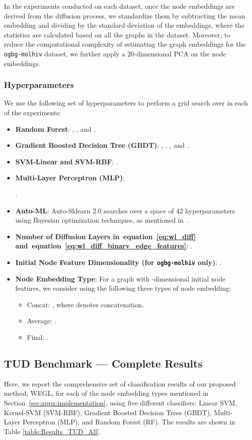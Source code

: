 \documentclass[table]{article} \usepackage{iclr2021_conference,times}
\def\eqref#1{equation~\ref{#1}}
\begin{document}
In the experiments conducted on each dataset, once the node embeddings are derived from the diffusion process, we standardize them by subtracting the mean embedding and dividing by the standard deviation of the embeddings, where the statistics are calculated based on all the graphs in the dataset. Moreover, to reduce the computational complexity of estimating the graph embeddings for the \texttt{ogbg-molhiv} dataset, we further apply a 20-dimensional PCA on the node embeddings.

\subsubsection*{Hyperparameters}
We use the following set of hyperparameters to perform a grid search over in each of the experiments:
\begin{itemize}
    \item \textbf{Random Forest}: , , and .
    \item \textbf{Gradient Boosted Decision Tree (GBDT)}: , , , and .
    \item \textbf{SVM-Linear and SVM-RBF}: .
    \item \textbf{Multi-Layer Perceptron (MLP)}:
    
    .
    \item \textbf{Auto-ML}: Auto-Sklearn 2.0 searches over a space of 42 hyperparameters using Bayesian optimization techniques, as mentioned in~\cite{feurer2020auto}.
    \item \textbf{Number of Diffusion Layers in~\eqref{eq:wl_diff} and~\eqref{eq:wl_diff_binary_edge_features}}: .
    \item \textbf{Initial Node Feature Dimensionality (for \texttt{ogbg-molhiv} only)}: .
    \item \textbf{Node Embedding Type}: For a graph with -dimensional initial node features, we consider using the following three types of node embedding:
\begin{itemize}
    \item Concat: , where  denotes concatenation.
    
    \item Average: .
    
    \item Final: .
\end{itemize}
\end{itemize}




\subsection{TUD Benchmark --- Complete Results}
\label{sec:appx:full_wegl_results}
Here, we report the comprehensive set of classification results of our proposed method, WEGL, for each of the node embedding types mentioned in Section~\ref{sec:appx:implementation}, using five different classifiers: Linear SVM, Kernel-SVM (SVM-RBF), Gradient Boosted Decision Trees (GBDT), Multi-Layer Perceptron (MLP), and Random Forest (RF). The results are shown in Table \ref{table:Results_TUD_All}.
\end{document}
